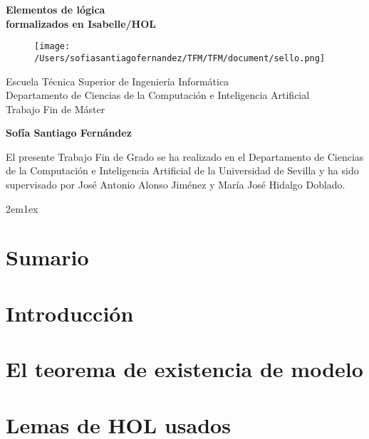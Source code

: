 \documentclass[12pt,a4paper,twoside]{book}
\begin{document}
\begin{titlepage}
 \vspace*{2cm}
  \begin{center}
    {\huge \textbf{Elementos de lógica \\ \vspace*{1em}
                   formalizados en Isabelle/HOL}}
  \end{center}
  \vspace{3cm}
  \begin{center}
    \begin{figure}[h]
    \centering
    \texttt{[image: /Users/sofiasantiagofernandez/TFM/TFM/document/sello.png]}
    \end{figure}
  \vspace{3cm}
    {\normalsize Escuela Técnica Superior de Ingeniería Informática} \\
    {\normalsize Departamento de Ciencias de la Computación e Inteligencia Artificial}\\
    {\normalsize Trabajo Fin de Máster} \\
  \end{center}
  \begin{center}
    {\large \textbf{Sofía Santiago Fernández}}
  \end{center}
\end{titlepage}

\newpage


El presente Trabajo Fin de Grado se ha realizado en el Departamento de
Ciencias de la Computación e Inteligencia Artificial de la Universidad
de Sevilla y ha sido supervisado por José Antonio Alonso Jiménez y María
José Hidalgo Doblado.

\newpage

\tableofcontents

\parindent 2em\parskip 1ex

% 
\chapter*{Sumario}

\chapter*{Introducción}


\chapter{El teorema de existencia de modelo}


\appendix
\chapter{Lemas de HOL usados}


\nocite{fitting1996first,LMF,CC,articulo,escribir,tutorial,main,isar,implementation,intro,gamut,modal,proofsystems,automatic,coq}


\end{document}
